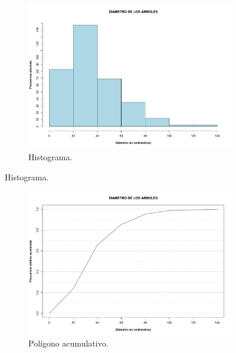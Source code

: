 \documentclass[11pt]{article}
\begin{document}
\begin{figure}[h!]
  \begin{center}
    \begin{subfigure}[b]{0.9\linewidth}
      \includegraphics[width=\linewidth]{histDiametro.pdf}
      \caption{Histograma.}
      \label{fig:histDiametro}
    \end{subfigure}
  \end{center}
\end{figure}

\begin{figure}[h!]
  \ContinuedFloat
  \begin{center}
    \begin{subfigure}[b]{0.9\linewidth}
      \includegraphics[width=\linewidth]{acumDiametro.pdf}
      \caption{Polígono acumulativo.}
      \label{fig:acumDiametro}
    \end{subfigure}
  \caption{}
  \end{center}  
\end{figure}
\end{document}
